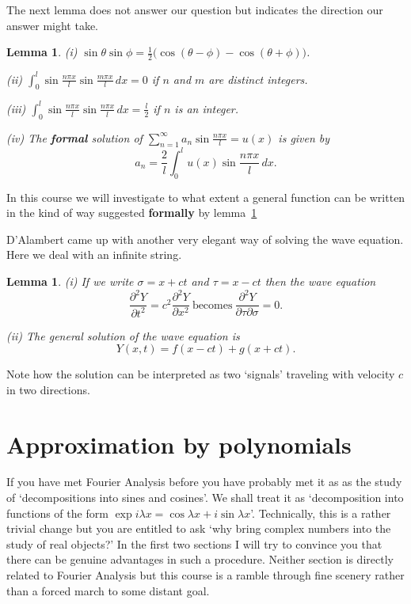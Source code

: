 \documentclass[12pt]{article}
\newtheorem{lemma}[theorem]{Lemma}
\theoremstyle{definition}
\begin{document}
The next lemma does not answer our question but
indicates the direction our answer might take.
\begin{lemma}\label{L, Expand string} 
(i) $\sin\theta\sin\phi=\tfrac{1}{2}
\big(\cos(\theta-\phi)-\cos(\theta+\phi)\big)$.

(ii) ${\displaystyle
\int_{0}^{l}\sin\frac{n\pi x}{l}\sin\frac{m\pi x}{l}\,dx=0}$
if $n$ and $m$ are distinct integers.

(iii) ${\displaystyle
\int_{0}^{l}\sin\frac{n\pi x}{l}\sin\frac{n\pi x}{l}\,dx=\frac{l}{2}}$
if $n$ is an integer.

(iv) The {\bf formal} solution of
$\sum_{n=1}^{\infty}a_{n}\sin\frac{n\pi x}{l}=u(x)$
is given by 
\[a_{n}=\frac{2}{l}\int_{0}^{l}u(x)\sin\frac{n\pi x}{l}\,dx.\]
\end{lemma}
In this course we will investigate to what extent
a general function can be written in the kind of way
suggested {\bf formally} by lemma~\ref{L, Expand string} 

D'Alambert came up with another very elegant way of solving
the wave equation. Here we deal with an infinite string.
\begin{lemma} (i) If we write $\sigma=x+ct$
and $\tau=x-ct$ then the wave equation
\[\frac{\partial^{2} Y}{\partial t^{2}}
=c^{2}\frac{\partial^{2} Y}{\partial x^{2}}
\ \text{becomes}
\  \frac{\partial^{2} Y}{\partial \tau\partial \sigma}=0.\]

(ii) The general solution of the wave equation is
\[Y(x,t)=f(x-ct)+g(x+ct).\]
\end{lemma}
Note how the solution can be interpreted as two `signals'
traveling with velocity $c$ in two directions. 
\section{Approximation by polynomials}\label{S, Polynomial}
If you have met Fourier Analysis before you have probably
met it as as the study of `decompositions into sines and cosines'.
We shall treat it as `decomposition into functions of
the form $\exp i\lambda x=\cos\lambda x+i\sin\lambda x$'.
Technically, this is a rather trivial change but you are
entitled to ask `why bring complex numbers into the study
of real objects?' In the first two sections I will try
to convince you that there can be genuine advantages
in such a procedure. Neither section is directly related
to Fourier Analysis but this course is a ramble through
fine scenery rather than a forced march to some distant
goal.
\end{document}
